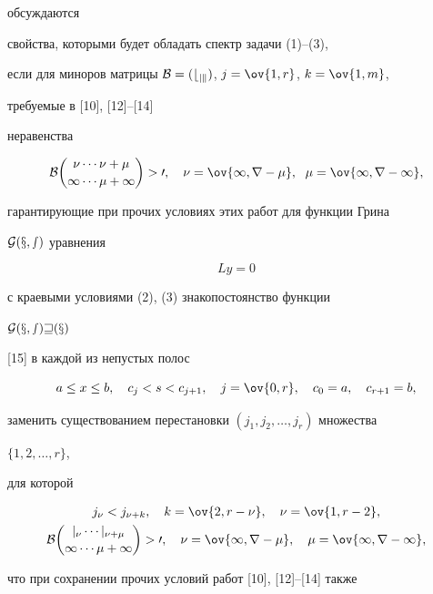 обсуждаются 


свойства, которыми будет обладать спектр задачи (1)--(3), 


если для миноров матрицы $\cal B=(b_{jk})$, $j=\ov{1,r}$, $k=\ov{1,m}$, 


требуемые в [10], [12]--[14] 


неравенства 


\begin{equation} 


\cal B\binom{\nu\dotsb\nu+\mu}{1\dotsb\mu+1}>0,\quad 


\nu=\ov{1,r-\mu},\ \; \mu=\ov{1,r-1}, 


\end{equation} 


гарантирующие при прочих условиях этих работ для функции Грина 


$\cal G(x,s)$ уравнения 


\begin{equation} 


L y=0 


\end{equation} 


с краевыми условиями (2), (3) знакопостоянство функции 


$\cal G(x,s)w(x)$ 


[15] в каждой из непустых полос 


\begin{equation} 


a\le x\le b,\quad c_j<s<c_{j+1},\quad 


j=\ov{0,r},\quad c_0=a,\quad c_{r+1}=b, 


\end{equation} 


заменить существованием перестановки $(j_1,j_2,\dotsc,j_r)$ множества 


$\{1,2,\dotsc,r\}$, 


для которой 


\begin{gather} 


j_\nu<j_{\nu+k},\quad k=\ov{2,r-\nu},\quad \nu=\ov{1,r-2}, \\ 


\cal B\binom{j_\nu\dotsb j_{\nu+\mu}}{1\dotsb\mu+1}>0,\quad 


\nu=\ov{1,r-\mu},\quad \mu=\ov{1,r-1}, 


\end{gather} 


что при сохранении прочих условий работ [10], [12]--[14] также 


